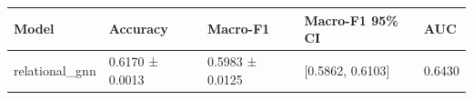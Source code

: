 \begin{tabular}{lllll}
\toprule
Model & Accuracy & Macro-F1 & Macro-F1 95\% CI & AUC \\
\midrule
relational\_gnn & 0.6170 ± 0.0013 & 0.5983 ± 0.0125 & [0.5862, 0.6103] & 0.6430 \\
\bottomrule
\end{tabular}
